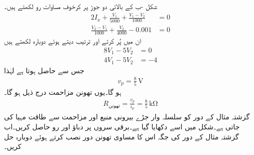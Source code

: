 شکل -ب کے بالائی دو جوڑ پر کرخوف مساوات رو لکھتے ہیں۔
\begin{align*}
2I_x +\frac{V_1}{5000}+\frac{V_1-V_2}{1000}&=0\\
\frac{V_2-V_1}{1000}+\frac{V_2}{4000}-0.001&=0
\end{align*}
ان میں  پُر کرتے اور ترتیب دیتے ہوئے دوبارہ لکھتے ہیں
\begin{align*}
8V_1-5V_2&=0\\
4V_1-5V_2&=-4
\end{align*}
جس سے  حاصل ہوتا ہے لہٰذا
\begin{align*}
v_p=\frac{8}{5} \, \si{\volt}
\end{align*}
ہو گا۔یوں تھونن مزاحمت درج ذیل ہو گا۔
\begin{align*}
R_{\text{تھونن}}=\frac{v_p}{i_p}=\frac{8}{5}\,\si{\kilo\ohm}
\end{align*}
گزشتہ مثال کے دور کو سلسلہ وار جڑے بیرونی منبع  اور مزاحمت سے طاقت مہیا کی جاتی ہے۔شکل  میں اسے دکھایا گیا ہے۔برقی سروں پر دباؤ  اور رو  حاصل کریں۔اب گزشتہ مثال کے دور کی جگہ اس کا مساوی تھونن دور نصب کرتے ہوئے دوبارہ حل کریں۔
